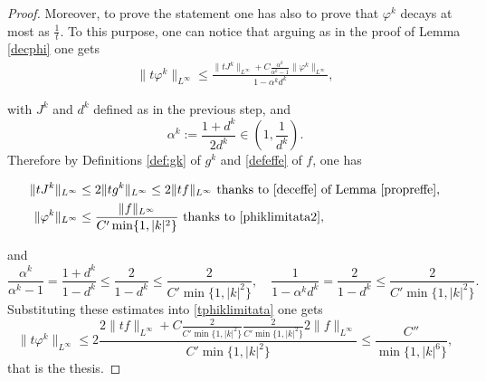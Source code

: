 \documentclass[a4paper,10pt,reqno]{amsart}
\numberwithin{equation}{subsection}
\numberwithin{figure}{subsection}
\begin{document}
\begin{proof}
Moreover, to prove the statement one has also to prove that $\varphi^k$ decays at most as $\frac{1}{t}$. To this purpose, one can notice that arguing as in the proof of Lemma \ref{decphi} one gets
\begin{align}\label{tphiklimitata}
\|t\varphi^k\|_{L^{\infty}}\leq\frac{\|tJ^k\|_{L^{\infty}}+C\frac{\alpha^k}{\alpha^k-1}\|\varphi^k\|_{L^{\infty}}}{1-\alpha^kd^k},
\end{align}

with $J^k$ and $d^k$ defined as in the previous step, and
\[
\alpha^k:=\frac{1+d^k}{2d^k}\in\left(1,\frac{1}{d^k}\right).
\]
Therefore by Definitions \ref{def:gk} of $g^k$ and \ref{defeffe} of $f$, one has 

\begin{align*}
\|tJ^k\|_{L^{\infty}}&\leq2\|tg^k\|_{L^{\infty}}\leq2\|tf\|_{L^{\infty}}\textrm{ thanks to \eqref{deceffe} of Lemma \ref{propreffe}},
\\
\|\varphi^k\|_{L^{\infty}}&\leq\frac{\|f\|_{L^{\infty}}}{C'\min\{1,|k|^2\}}\textrm{ thanks to \eqref{phiklimitata2}},
\end{align*}

and
{\small\[
\frac{\alpha^k}{\alpha^k-1}=\frac{1+d^k}{1-d^k}\leq\frac{2}{1-d^k}\leq\frac{2}{C'\min\{1,|k|^2\}},\quad\frac{1}{1-\alpha^kd^k}=\frac{2}{1-d^k}\leq\frac{2}{C'\min\{1,|k|^2\}}.
\]}
Substituting these estimates into \eqref{tphiklimitata} one gets
\[
\|t\varphi^k\|_{L^{\infty}}\leq2\frac{2\|tf\|_{L^{\infty}}+C\frac{2}{C'\min\{1,|k|^2\}}\frac{2}{C'\min\{1,|k|^2\}}2\|f\|_{L^{\infty}}}{C'\min\{1,|k|^2\}}\leq \frac{C''}{\min\{1,|k|^6\}},
\]
that is the thesis.
\end{proof}
\end{document}
